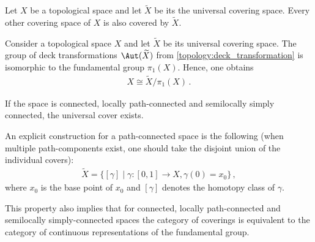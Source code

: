     \begin{uproperty}
        Let $X$ be a topological space and let $\widetilde{X}$ be its the universal covering space. Every other covering space of $X$ is also covered by $\widetilde{X}$.
    \end{uproperty}
    \begin{property}[Automorphisms]\label{topology:universal_cover_automorphisms}
        Consider a topological space $X$ and let $\widetilde{X}$ be its universal covering space. The group of deck transformations $\Aut(\widetilde{X})$ from \cref{topology:deck_transformation} is isomorphic to the fundamental group $\pi_1(X)$. Hence, one obtains
        \begin{gather}
            X\cong\widetilde{X}/\pi_1(X)\,.
        \end{gather}
    \end{property}
    \begin{property}[Existence]
        If the space is connected, locally path-connected and semilocally simply connected, the universal cover exists.

        An explicit construction for a path-connected space is the following (when multiple path-components exist, one should take the disjoint union of the individual covers):
        \begin{gather}
            \widetilde{X} = \{[\gamma]\mid\gamma:[0,1]\rightarrow X,\gamma(0)=x_0\}\,,
        \end{gather}
        where $x_0$ is the base point of $x_0$ and $[\gamma]$ denotes the homotopy class of $\gamma$.
    \end{property}
    \begin{result}\label{topology:equivalent_categories}
        This property also implies that for connected, locally path-connected and semilocally simply-connected spaces the category of coverings is equivalent to the category of continuous representations of the fundamental group.
    \end{result}

